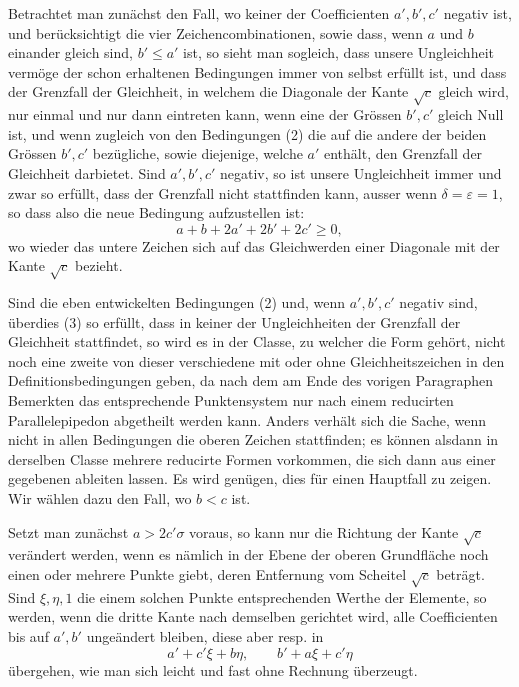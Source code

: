\documentclass[11pt]{article}
\begin{document}
Betrachtet man zunächst den Fall, wo keiner der Coefficienten $a',b',c'$ negativ ist, und berücksichtigt die vier Zeichencombinationen, sowie dass, wenn $a$ und $b$ einander gleich sind, $b'\le a'$ ist, so sieht man sogleich, dass unsere Ungleichheit vermöge der schon erhaltenen Bedingungen immer von selbst erfüllt ist, und dass der Grenzfall der Gleichheit, in welchem die Diagonale der Kante $\sqrt c$ gleich wird, nur einmal und nur dann eintreten kann, wenn eine der Grössen $b',c'$ gleich Null ist, und wenn zugleich von den Bedingungen (2) die auf die andere der beiden Grössen $b',c'$ bezügliche, sowie diejenige, welche $a'$ enthält, den Grenzfall der Gleichheit darbietet. Sind $a',b',c'$ negativ, so ist unsere Ungleichheit immer und zwar so erfüllt, dass der Grenzfall nicht stattfinden kann, ausser wenn $\delta=\varepsilon=1$, so dass also die neue Bedingung aufzustellen ist:
\begin{equation}
 a+b+2a'+2b'+2c'\ge0,
\end{equation}
wo wieder das untere Zeichen sich auf das Gleichwerden einer Diagonale mit der Kante $\sqrt c$ bezieht.

Sind die eben entwickelten Bedingungen (2) und, wenn $a',b',c'$ negativ sind, überdies (3) so erfüllt, dass in keiner der Ungleichheiten der Grenzfall der Gleichheit stattfindet, so wird es in der Classe, zu welcher die Form gehört, nicht noch eine zweite von dieser verschiedene mit oder ohne Gleichheitszeichen in den Definitionsbedingungen geben, da nach dem am Ende des vorigen Paragraphen Bemerkten das entsprechende Punktensystem nur nach einem reducirten Parallelepipedon abgetheilt werden kann. Anders verhält sich die Sache, wenn nicht in allen Bedingungen die oberen Zeichen stattfinden; es können alsdann in derselben Classe mehrere reducirte Formen vorkommen, die sich dann aus einer gegebenen ableiten lassen. Es wird genügen, dies für einen Hauptfall zu zeigen. Wir wählen dazu den Fall, wo $b<c$ ist.

Setzt man zunächst $a>2c'\sigma$ voraus, so kann nur die Richtung der Kante $\sqrt c$ verändert werden, wenn es nämlich in der Ebene der oberen Grundfläche noch einen oder mehrere Punkte giebt, deren Entfernung vom Scheitel $\sqrt c$ beträgt. Sind $\xi,\eta,1$ die einem solchen Punkte entsprechenden Werthe der Elemente, so werden, wenn die dritte Kante nach demselben gerichtet wird, alle Coefficienten bis auf $a',b'$ ungeändert bleiben, diese aber resp. in
\[
 a'+c'\xi+b\eta,
 \qquad b'+a\xi+c'\eta
\]
übergehen, wie man sich leicht und fast ohne Rechnung überzeugt.
\end{document}
